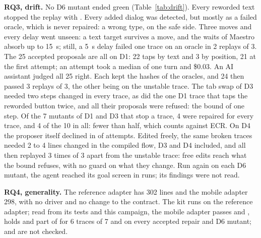 \textbf{RQ3, drift.} No \textsf{D6} mutant ended green (Table~\ref{tab:drift}). Every reworded text stopped the replay with . Every added dialog was detected, but mostly as a failed oracle, which is never repaired: a wrong type, on the safe side. Three moves and every delay went unseen: a text target survives a move, and the waits of Maestro absorb up to 15~s; still, a 5~s delay failed one trace on an oracle in 2 replays of 3. The 25 accepted proposals are all on \textsf{D1}: 22 taps by text and 3 by position, 21 at the first attempt; an attempt took a median of one turn and \$0.03. An AI assistant judged all 25 right. Each kept the hashes of the oracles, and 24 then passed 3 replays of 3, the other being on the unstable trace. The tab swap of \textsf{D3} needed two steps changed in every trace, as did the one \textsf{D1} trace that taps the reworded button twice, and all their proposals were refused: the bound of one step. Of the 7 mutants of \textsf{D1} and \textsf{D3} that stop a trace, 4 were repaired for every trace, and 4 of the 10 in all: fewer than half, which counts against ECR. On \textsf{D4} the proposer itself declined in \BEdfournone{} of \BEdfourattempts{} attempts. Edited freely, the same \HANDtraces{} broken traces needed 2 to 4 lines changed in the compiled flow, \textsf{D3} and \textsf{D4} included, and all then replayed 3 times of 3 apart from the unstable trace: free edits reach what the bound refuses, with no guard on what they change. Run again on each \textsf{D6} mutant, the agent reached its goal screen in \DSIXgoal{} runs; its findings were not read.

\textbf{RQ4, generality.} The reference adapter has 302 lines and the mobile adapter 298, with no driver and no change to the contract. The kit runs on the reference adapter; read from its tests and this campaign, the mobile adapter passes  and , holds  and part of  for 6 traces of 7 and  on every accepted repair and \textsf{D6} mutant;  and  are not checked.
